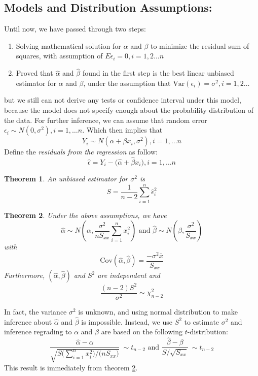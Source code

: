 \documentclass[11pt]{article}
\newtheorem{thm}{Theorem}[subsection]
\begin{document}
\subsection{Models and Distribution Assumptions: }
Until now, we have passed through  two steps:
\begin{enumerate}
	\item Solving mathematical solution for $\alpha$ and $\beta$ to minimize the residual sum of squares, with assumption of $E\epsilon_i = 0, i = 1, 2 \dots n $
	\item Proved that $\hat{\alpha}$ and $\hat{\beta}$ found in the first step is the best linear unbiased estimator for $\alpha$ and $\beta$, under the assumption that $\text{Var}(\epsilon_{i}) = \sigma^2, i = 1,2 \dots$
\end{enumerate}
but we still can not derive any tests or confidence interval under this model, because the model does not specify enough about the probability distribution of the data. For further inference, we can assume that random error $\epsilon_i \sim N(0, \sigma^2), i = 1, \dots n$. Which then implies that 
$$Y_i \sim N(\alpha + \beta x_i, \sigma^2) , i = 1, \dots n $$
Define the \textit{residuals from the regression} as follow:  
\begin{equation} \label{eq: residuals}
	\hat{\epsilon} = Y_i - \big( \hat{\alpha} + \hat{\beta } x_i\big), i = 1, \dots n
\end{equation} 

\begin{thm}
	An unbiased estimator for $\sigma^2$ is 
	$$S = \dfrac{1}{n - 2} \sum_{i = 1}^n \hat{\epsilon}_i^2$$
\end{thm}
\begin{thm} \label{thm: param dist}
	Under the above assumptions, we have
	$$\hat{\alpha} \sim N\left(\alpha, \dfrac{\sigma^2}{n S_{xx}}  \sum_{i = 1}^n x_i^2\right) \text{ and } \hat{\beta } \sim N\left(\beta, \dfrac{\sigma^2}{S_{xx}}\right) $$
	with
	$$\text{Cov}(\hat{\alpha}, \hat{\beta }) = \dfrac{-\sigma^2\bar{x}}{S_{xx}} $$
	Furthermore, $\left(\hat{\alpha}, \hat{\beta }\right)$ and $S^2$ are independent and 
	$$ \dfrac{(n - 2)S^2}{\sigma^2} \sim \chi^2_{n - 2} $$
\end{thm}
In fact, the variance $\sigma^2$ is unknown, and using normal distribution to make inference about $\hat{\alpha}$ and $\hat{\beta }$ is impossible. Instead, we use $S^2$ to estimate $\sigma^2$ and inference regrading to $\alpha$ and $\beta$ are based on the following $t$-distribution:
$$ \dfrac{\hat{\alpha} - \alpha}{\sqrt{S\big(\sum_{i = 1}^n x_i^2\big) / \big(nS_{xx}\big)}}  ~ \sim t_{n - 2} \text{ and } \dfrac{\hat{\beta} - \beta}{S/\sqrt{S_{xx}}} ~ \sim t_{n - 2}$$
This  result is immediately from theorem  \ref{thm: param dist}.
\end{document}
